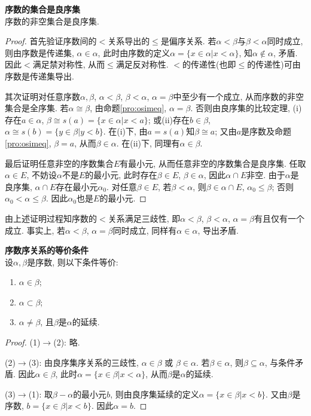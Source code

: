 \begin{thm} \textbf{序数的集合是良序集}\\
序数的非空集合是良序集.
\end{thm}
\begin{proof}
\par 首先验证序数间的$<$关系导出的$\le$是偏序关系. 若$\alpha<\beta$与$\beta<\alpha$同时成立, 则由序数是传递集, $\alpha\in \alpha$, 此时由序数的定义$\alpha=\{x\in \alpha\vert x<\alpha\}$, 知$\alpha \notin \alpha$, 矛盾. 因此$<$满足禁对称性, 从而$\le$满足反对称性. $<$的传递性(也即$\le$的传递性)可由序数是传递集导出. 
\par 其次证明对任意序数$\alpha, \beta$, $\alpha<\beta$, $\beta<\alpha$, $\alpha=\beta$中至少有一个成立, 从而序数的非空集合是全序集. 若$\alpha\cong \beta$, 由命题\ref{pro:osimeq}, $\alpha=\beta$. 否则由良序集的比较定理, (i)存在$a\in \alpha$, $\beta \cong s(a)=\{x\in \alpha\vert x<a\}$; 或(ii)存在$b\in \beta$, $\alpha \cong s(b)=\{y\in \beta \vert y<b\}$. 在(i)下, 由$a=s(a)$知$\beta \cong a$; 又由$a$是序数及命题\ref{pro:osimeq}, $\beta=a$, 从而$\beta\in \alpha$. 在(ii)下, 同理有$\alpha\in \beta$.
\par 最后证明任意非空的序数集合$E$有最小元, 从而任意非空的序数集合是良序集. 任取$\alpha \in E$, 不妨设$\alpha$不是$E$的最小元, 此时存在$\beta \in E$, $\beta\in \alpha$, 因此$\alpha \cap E$非空. 由于$\alpha$是良序集, $\alpha \cap E$存在最小元$\alpha_0$. 对任意$\beta \in E$, 若$\beta <\alpha$, 则$\beta \in \alpha \cap E$, $\alpha_0\le \beta$; 否则$\alpha_0<\alpha\le \beta$. 因此$\alpha_0$也是$E$的最小元. 
\end{proof}
由上述证明过程知序数的$<$关系满足三歧性, 即$\alpha<\beta$, $\beta<\alpha$, $\alpha=\beta$有且仅有一个成立. 事实上, 若$\alpha<\beta$, $\alpha=\beta$同时成立, 同样有$\alpha\in \alpha$, 导出矛盾. 

\begin{col} \textbf{序数序关系的等价条件}\\
设$\alpha, \beta$是序数, 则以下条件等价:
\begin{enumerate}
    \item $\alpha\in \beta$;
    \item $\alpha\subset \beta$;
    \item $\alpha\neq \beta$, 且$\beta$是$\alpha$的延续.
\end{enumerate}
\end{col}
\begin{proof}(1)$\to$(2): 略.  
\par (2)$\to$(3): 由良序集序关系的三歧性, $\alpha \in \beta$ 或 $\beta \in \alpha$.  若$\beta \in \alpha$, 则$\beta\subseteq \alpha$, 与条件矛盾. 因此$\alpha \in \beta$, 此时$\alpha=\{x\in \beta\vert x<\alpha\}$, 从而$\beta$是$\alpha$的延续. 
\par (3)$\to$(1): 取$\beta-\alpha$的最小元$b$, 则由良序集延续的定义$\alpha=\{x\in \beta\vert x<b\}$. 又由$\beta$是序数, $b=\{x\in \beta\vert x<b\}$. 因此$\alpha=b$. 
\end{proof}

